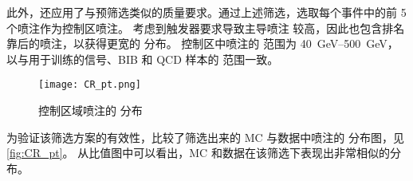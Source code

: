 此外，还应用了与预筛选类似的质量要求。通过上述筛选，选取每个事件中的前 5 个喷注作为控制区喷注。
考虑到触发器要求导致主导喷注 \pt 较高，因此也包含排名靠后的喷注，以获得更宽的 \pt 分布。
控制区中喷注的 \pt 范围为 \SI{40}{GeV}–\SI{500}{GeV}，以与用于训练的信号、BIB 和 QCD 样本的 \pt 范围一致。

\begin{figure}[ht]
      \centering
      \texttt{[image: CR\_pt.png]}
      \caption{控制区域喷注的 \pt 分布}
      \label{fig:CR_pt}
\end{figure}

为验证该筛选方案的有效性，比较了筛选出来的 MC 与数据中喷注的 \pt 分布图，见\autoref{fig:CR_pt}。
从比值图中可以看出，MC 和数据在该筛选下表现出非常相似的分布。
